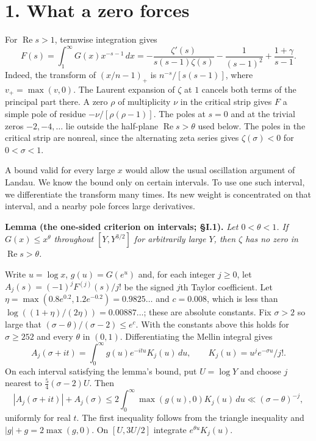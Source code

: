 \documentclass[11pt,letterpaper]{article}
\newcommand{\re}{\operatorname{Re}}
\begin{document}
{\setlength{\parindent}{0pt}\setlength{\parskip}{.32\baselineskip plus 1pt}
\section*{1. What a zero forces}

For $\re s>1$, termwise integration gives
\begin{equation}\label{D:38}
 F(s)=\int_1^\infty G(x)x^{-s-1}\,dx
 =-\frac{\zeta'(s)}{s(s-1)\zeta(s)}
   -\frac1{(s-1)^2}+\frac{1+\gamma}{s-1}.
\end{equation}
Indeed, the transform of $(x/n-1)_+$ is $n^{-s}/[s(s-1)]$, where $v_+=\max(v,0)$. The Laurent expansion of $\zeta$ at $1$ cancels both terms of the principal part there. A zero $\rho$ of multiplicity $\nu$ in the critical strip gives $F$ a simple pole of residue $-\nu/[\rho(\rho-1)]$. The poles at $s=0$ and at the trivial zeros $-2,-4,\ldots$ lie outside the half-plane $\re s>\theta$ used below. The poles in the critical strip are nonreal, since the alternating zeta series gives $\zeta(\sigma)<0$ for $0<\sigma<1$.

A bound valid for every large $x$ would allow the usual oscillation argument of Landau. We know the bound only on certain intervals. To use one such interval, we differentiate the transform many times. Its new weight is concentrated on that interval, and a nearby pole forces large derivatives.

\textbf{Lemma (the one-sided criterion on intervals; \S I.1).} \textit{Let $0<\theta<1$. If $G(x)\le x^\theta$ throughout $[Y,Y^{3/2}]$ for arbitrarily large $Y$, then $\zeta$ has no zero in $\re s>\theta$.}

Write $u=\log x$, $g(u)=G(e^u)$ and, for each integer $j\ge0$, let $A_j(s)=(-1)^jF^{(j)}(s)/j!$ be the signed $j$th Taylor coefficient. Let $\eta=\max(0.8e^{0.2},1.2e^{-0.2})=0.9825\ldots$ and $c=0.008$, which is less than $\log((1+\eta)/(2\eta))=0.00887\ldots$; these are absolute constants. Fix $\sigma>2$ so large that $(\sigma-\theta)/(\sigma-2)\le e^{c}$. With the constants above this holds for $\sigma\ge252$ and every $\theta$ in $(0,1)$. Differentiating the Mellin integral gives
\begin{equation}\label{D:39}
 A_j(\sigma+it)=\int_0^\infty g(u)e^{-itu}K_j(u)\,du,
 \qquad K_j(u)=u^je^{-\sigma u}/j!.
\end{equation}
On each interval satisfying the lemma's bound, put $U=\log Y$ and choose $j$ nearest to $\tfrac54(\sigma-2)U$. Then
\begin{equation}\label{D:40}
 |A_j(\sigma+it)|+A_j(\sigma)
 \le 2\int_0^\infty \max(g(u),0)K_j(u)\,du
 \ll (\sigma-\theta)^{-j},                                      \tag{1.1}
\end{equation}
uniformly for real $t$. The first inequality follows from the triangle inequality and $|g|+g=2\max(g,0)$. On $[U,3U/2]$ integrate $e^{\theta u}K_j(u)$.

}
\end{document}
